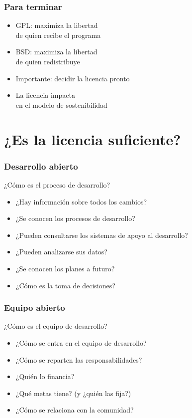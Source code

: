 \documentclass[17pt,aspectratio=169]{beamer}
\begin{document}

\begin{frame}
\frametitle{Para terminar}

\begin{itemize}
\item GPL: maximiza la libertad \\
  de quien recibe el programa
\item BSD: maximiza la libertad \\
  de quien redistribuye
\item Importante: decidir la licencia pronto
\item La licencia impacta \\
  en el modelo de sostenibilidad
\end{itemize}

\end{frame}

\section{¿Es la licencia suficiente?}


\begin{frame}
\frametitle{Desarrollo abierto}

¿Cómo es el proceso de desarrollo?

\begin{itemize}
\item ¿Hay información sobre todos los cambios?
\item ¿Se conocen los procesos de desarrollo?
\item ¿Pueden consultarse los sistemas de apoyo al desarrollo?
\item ¿Pueden analizarse sus datos?
\item ¿Se conocen los planes a futuro?
\item ¿Cómo es la toma de decisiones?
\end{itemize}

\end{frame}


\begin{frame}
\frametitle{Equipo abierto}

¿Cómo es el equipo de desarrollo?

\begin{itemize}
\item ¿Cómo se entra en el equipo de desarrollo?
\item ¿Cómo se reparten las responsabilidades?
\item ¿Quién lo financia?
\item ¿Qué metas tiene? (y ¿quién las fija?)
\item ¿Cómo se relaciona con la comunidad?
\end{itemize}

\end{frame}
\end{document}
